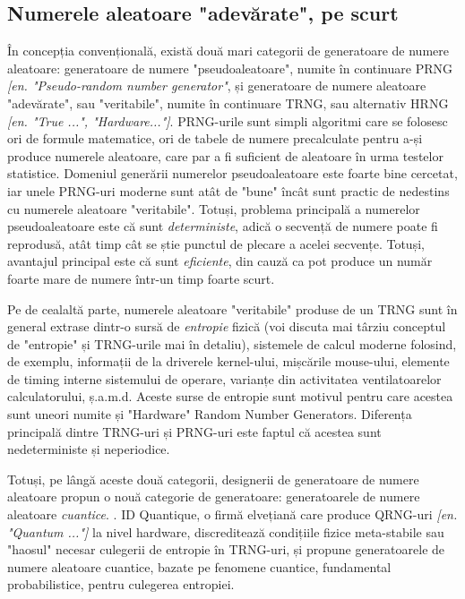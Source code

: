 \subsection{Numerele aleatoare "adevărate", pe scurt}
În concepția convențională, există două mari categorii de generatoare de numere aleatoare: generatoare de numere "pseudoaleatoare", numite în continuare PRNG \textit{[en. "Pseudo-random number generator"}, și generatoare de numere aleatoare "adevărate", sau "veritabile", numite în continuare TRNG, sau alternativ HRNG \textit{[en. "True ...", "Hardware..."]}. PRNG-urile sunt simpli algoritmi care se folosesc ori de formule matematice, ori de tabele de numere precalculate pentru a-și produce numerele aleatoare, care par a fi suficient de aleatoare în urma testelor statistice. Domeniul generării numerelor pseudoaleatoare este foarte bine cercetat, iar unele PRNG-uri moderne sunt atât de "bune" încât sunt practic de nedestins cu numerele aleatoare "veritabile". Totuși, problema principală a numerelor pseudoaleatoare este că sunt \textit{deterministe}, adică o secvență de numere poate fi reprodusă, atât timp cât se știe punctul de plecare a acelei secvențe. Totuși, avantajul principal este că sunt \textit{eficiente}, din cauză ca pot produce un număr foarte mare de numere într-un timp foarte scurt. 

Pe de cealaltă parte, numerele aleatoare "veritabile" produse de un TRNG sunt în general extrase dintr-o sursă de \textit{entropie} fizică (voi discuta mai târziu conceptul de "entropie" și TRNG-urile mai în detaliu), sistemele de calcul moderne folosind, de exemplu, informații de la driverele kernel-ului, mișcările mouse-ului, elemente de timing interne sistemului de operare, varianțe din activitatea ventilatoarelor calculatorului, ș.a.m.d. Aceste surse de entropie sunt motivul pentru care acestea sunt uneori numite și "Hardware" Random Number Generators. Diferența principală dintre TRNG-uri și PRNG-uri este faptul că acestea sunt nedeterministe și neperiodice. 

Totuși, pe lângă aceste două categorii, designerii de generatoare de numere aleatoare propun o nouă categorie de generatoare: generatoarele de numere aleatoare \textit{cuantice}. \cite{IDQuantique:QuantumvsClassical}. ID Quantique, o firmă elvețiană care produce QRNG-uri \textit{[en. "Quantum ..."]} la nivel hardware, discreditează condițiile fizice meta-stabile sau "haosul" necesar culegerii de entropie în TRNG-uri, și propune generatoarele de numere aleatoare cuantice, bazate pe fenomene cuantice, fundamental probabilistice, pentru culegerea entropiei.

